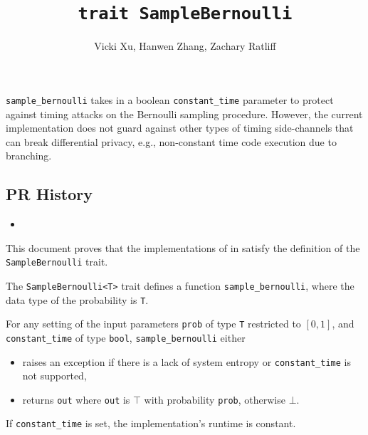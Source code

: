 \documentclass{article}
\title{\texttt{trait SampleBernoulli}}
\author{Vicki Xu, Hanwen Zhang, Zachary Ratliff}
\begin{document}
\maketitle

\contrib
\begin{tcolorbox}
    \begin{warning}
     \texttt{sample\_bernoulli} takes in a boolean \texttt{constant\_time} parameter to protect against timing attacks on the Bernoulli sampling procedure. However, the current implementation does not guard against other types of timing side-channels that can break differential privacy, e.g., non-constant time code execution due to branching.
    \end{warning}
\end{tcolorbox}

\subsection*{PR History}
\begin{itemize}
    \item {}
\end{itemize}

This document proves that the implementations of  in  
satisfy the definition of the \texttt{SampleBernoulli} trait.

\begin{definition}
    \label{sample-bernoulli}

    The \texttt{SampleBernoulli<T>} trait defines a function \texttt{sample\_bernoulli},
    where the data type of the probability is \texttt{T}.

    For any setting of the input parameters  
    \texttt{prob} of type \texttt{T} restricted to $[0, 1]$,
    and \texttt{constant\_time} of type \texttt{bool},
    \texttt{sample\_bernoulli} either
    \begin{itemize}
        \item raises an exception if there is a lack of system entropy or \texttt{constant\_time} is not supported,
        \item returns \texttt{out} where \texttt{out} is $\top$ with probability \texttt{prob}, otherwise $\bot$.
    \end{itemize}
     If \texttt{constant\_time} is set, the implementation's runtime is constant.    
\end{definition}
\end{document}
